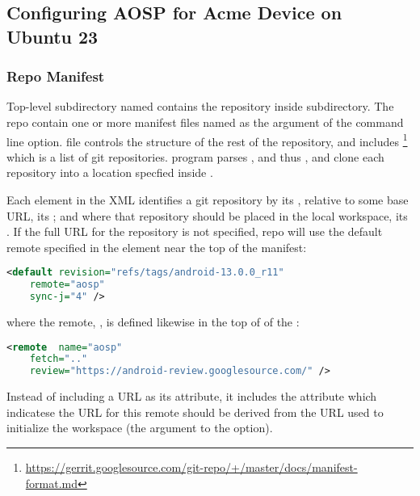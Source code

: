 \subsection{Configuring AOSP for Acme Device on Ubuntu 23}
\label{task:20231118_aosp_hal}


\subsubsection*{Repo Manifest}

Top-level subdirectory named  contains the  repository inside  subdirectory. The  repo contain one or more manifest files named as the argument of the  command line option.  file controls the structure of the rest of the repository, and includes \footnote{\url{https://gerrit.googlesource.com/git-repo/+/master/docs/manifest-format.md}} which is a list of git repositories.  program parses , and thus , and clone each repository into a location specfied inside .

Each  element in the XML identifies a git repository by its , relative to some base URL, its ; and where that repository should be placed in the local workspace, its . If the full URL for the repository is not specified, repo will use the default remote specified in the  element near the top of the manifest:
\begin{lstlisting}[language=xml]
<default revision="refs/tags/android-13.0.0_r11"
    remote="aosp"
    sync-j="4" />
\end{lstlisting}
where the remote, , is defined likewise in the top of of the :
\begin{lstlisting}[language=xml]
<remote  name="aosp"
    fetch=".."
    review="https://android-review.googlesource.com/" />
\end{lstlisting}
Instead of including a URL as its attribute, it includes the  attribute which indicatese the URL for this remote should be derived from the URL used to initialize the workspace (the argument to the  option).



